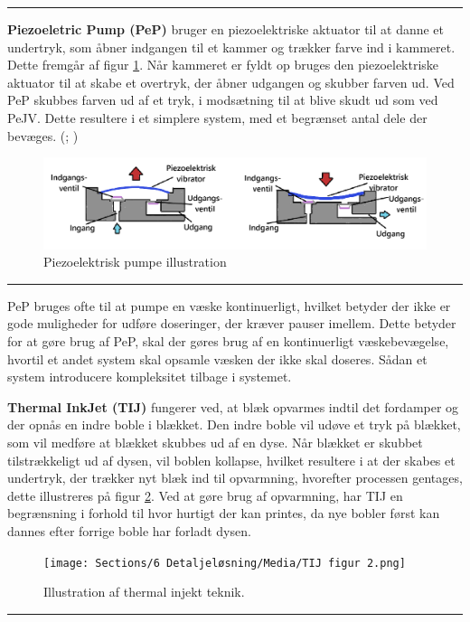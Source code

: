 \plainbreak{1}
\textbf{Piezoeletric Pump (PeP)} bruger en piezoelektriske aktuator til at danne et undertryk, som åbner indgangen til et kammer og trækker farve ind i kammeret. Dette fremgår af figur \ref{fig:PeMP}. Når kammeret er fyldt op bruges den piezoelektriske aktuator til at skabe et overtryk, der åbner udgangen og skubber farven ud. Ved PeP skubbes farven ud af et tryk, i modsætning til at blive skudt ud som ved PeJV. Dette resultere i et simplere system, med et begrænset antal dele der bevæges. (\cite{Benaissa2012PerformancesPiezo-pump}; \cite{Hoath2016FundamentalsDroplets})

\begin{figure}[H]
    \centering
    \includegraphics[width=1\linewidth]{Sections/5 Konceptgenerering/Media/pumpe.png}
    \caption{Piezoelektrisk pumpe illustration}
    \label{fig:PeMP}
\end{figure} \plainbreak{-0.5}

PeP bruges ofte til at pumpe en væske kontinuerligt, hvilket betyder der ikke er gode muligheder for udføre doseringer, der kræver pauser imellem. Dette betyder for at gøre brug af PeP, skal der gøres brug af en kontinuerligt væskebevægelse, hvortil et andet system skal opsamle væsken der ikke skal doseres. Sådan et system introducere kompleksitet tilbage i systemet.

\textbf{Thermal InkJet (TIJ)} fungerer ved, at blæk opvarmes indtil det fordamper og der opnås en indre boble i blækket. Den indre boble vil udøve et tryk på blækket, som vil medføre at blækket skubbes ud af en dyse. Når blækket er skubbet tilstrækkeligt ud af dysen, vil boblen kollapse, hvilket resultere i at der skabes et undertryk, der trækker nyt blæk ind til opvarmning, hvorefter processen gentages, dette illustreres på figur \ref{fig:TIJ figur}. \parencite{Hoath2016FundamentalsDroplets}
Ved at gøre brug af opvarmning, har TIJ en begrænsning i forhold til hvor hurtigt der kan printes, da nye bobler først kan dannes efter forrige boble har forladt dysen.


\begin{figure}[H]
    \centering
    \texttt{[image: Sections/6 Detaljeløsning/Media/TIJ figur 2.png]}
    \caption{Illustration af thermal injekt teknik.}
    \label{fig:TIJ figur}
\end{figure} \plainbreak{-.5}

